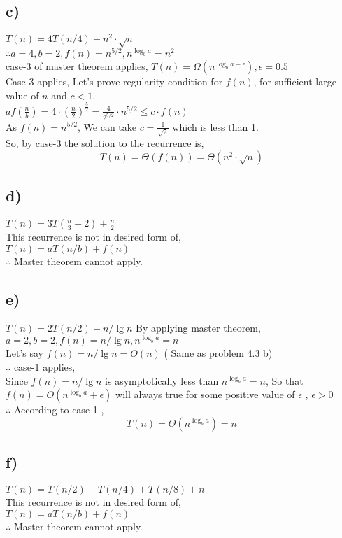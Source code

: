 \documentclass[a4paper, 11pt]{article}
\begin{document}
\subsection*{c)}
$T(n) = 4T(n/4) + n^2 \cdot \sqrt{n}$\\
$\therefore a=4, b=2, f(n)= n^{5/2} , n^{\log_{b}a} = n^2$\\
case-3 of master theorem applies,
$T(n) = \Omega(n^{\log_{b}a + \epsilon}) , \epsilon = 0.5$\\
Case-3 applies, Let's prove regularity condition for $f(n)$, for sufficient large value of $n$ and $c<1$.\\
$af(\frac{n}{b}) = 4\cdot(\frac{n}{2})^{\frac{5}{2}} = \frac{4}{2^{5/2}} \cdot n^{5/2} \le c \cdot f(n)$\\
As $f(n)=n^{5/2}$, We can take $c=\frac{1}{\sqrt{2}}$ which is less than 1.\\
So, by case-3 the solution to the recurrence is,
$$T(n) = \Theta (f(n)) = \Theta(n^2 \cdot \sqrt{n})$$

\subsection*{d)}
$T(n) =3T(\frac{n}{3} -2) + \frac{n}{2}$\\
This recurrence is not in desired form of,\\
$T(n) = aT(n/b) + f(n)$\\
$\therefore $ Master theorem cannot apply.

\subsection*{e)}
$T(n) = 2T(n/2) + n/ \lg n$
By applying master theorem, \\
$a=2 , b=2, f(n) = n/ \lg n ,  n^{\log_{b}a} = n$\\
Let's say $f(n)= n/ \lg n = O(n)$ ( Same as problem 4.3 b)\\
$\therefore$ case-1 applies,\\
Since $f(n) = n/ \lg n$ is asymptotically less than  $n^{\log_{b}a} = n$, So that $f(n) = O(n^{\log_{b}a}+\epsilon)$ will always true for some positive value of $\epsilon$ , $\epsilon > 0$\\
$\therefore$ According to case-1 ,
$$T(n) = \Theta ( n^{\log_{b}a}) = n $$


\subsection*{f)}
$T(n) = T(n/2) + T(n/4) + T(n/8) + n$\\
This recurrence is not in desired form of,\\
$T(n) = aT(n/b) + f(n)$\\
$\therefore $ Master theorem cannot apply. 
\end{document}
